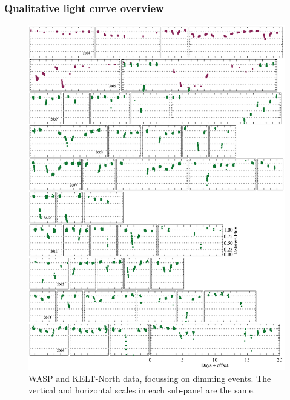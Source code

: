 \documentclass[]{rsos}
\begin{document}
\subsubsection{Qualitative light curve overview}\label{sss:quallc}

\begin{figure}
  \begin{center}
    \hspace{-0.5cm} \includegraphics[width=\textwidth]{figs/yearly-zoom.eps}
    \caption{WASP and KELT-North data, focussing on dimming events. The vertical and
      horizontal scales in each sub-panel are the same.}\label{fig:waspkeltzoom}
  \end{center}
\end{figure}
\end{document}
